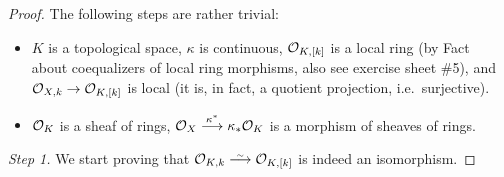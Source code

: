 \documentclass[a4paper,parskip=half,numbers=enddot, DIV=12]{scrreprt}
\begin{document}
\begin{proof}
    The following steps are rather trivial:
    \begin{itemize}
      \item 
        $K$ is a topological space, $\kappa$ is continuous, $\mathcal{O}_{K,[k]}$ is a local ring (by Fact~ about coequalizers of local ring morphisms, also see exercise sheet \#5), and $\Oo_{X,k} \morphism \Oo_{K,[k]}$ is local (it is, in fact, a quotient projection, i.e.\ surjective).
      \item 
        $\mathcal{O}_K$ is a sheaf of rings, $\Oo_X \morphism[\kappa^*] \kappa_*\Oo_K$ is a morphism of sheaves of rings.
    \end{itemize} 
    \emph{Step 1.} We start proving that $\Oo_{K,k}\isomorphism\Oo_{K,[k]}$ is indeed an isomorphism. 
    

\end{proof}
\end{document}
